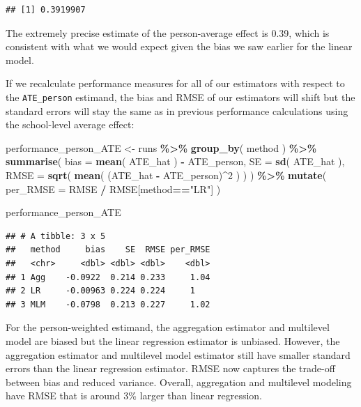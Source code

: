 \documentclass[
]{book}
\newenvironment{Shaded}{\begin{snugshade}}{\end{snugshade}}
\newcommand{\AttributeTok}[1]{\textcolor[rgb]{0.13,0.29,0.53}{#1}}
\newcommand{\DecValTok}[1]{\textcolor[rgb]{0.00,0.00,0.81}{#1}}
\newcommand{\FunctionTok}[1]{\textcolor[rgb]{0.13,0.29,0.53}{\textbf{#1}}}
\newcommand{\NormalTok}[1]{#1}
\newcommand{\OtherTok}[1]{\textcolor[rgb]{0.56,0.35,0.01}{#1}}
\newcommand{\SpecialCharTok}[1]{\textcolor[rgb]{0.81,0.36,0.00}{\textbf{#1}}}
\newcommand{\StringTok}[1]{\textcolor[rgb]{0.31,0.60,0.02}{#1}}
\begin{document}
\begin{verbatim}
## [1] 0.3919907
\end{verbatim}

The extremely precise estimate of the person-average effect is 0.39, which is consistent with what we would expect given the bias we saw earlier for the linear model.

If we recalculate performance measures for all of our estimators with respect to the \texttt{ATE\_person} estimand, the bias and RMSE of our estimators will shift but the standard errors will stay the same as in previous performance calculations using the school-level average effect:

\begin{Shaded}
\begin{Highlighting}[]
\NormalTok{performance\_person\_ATE }\OtherTok{\textless{}{-}}
\NormalTok{  runs }\SpecialCharTok{\%\textgreater{}\%} 
  \FunctionTok{group\_by}\NormalTok{( method ) }\SpecialCharTok{\%\textgreater{}\%}
  \FunctionTok{summarise}\NormalTok{( }
    \AttributeTok{bias =} \FunctionTok{mean}\NormalTok{( ATE\_hat ) }\SpecialCharTok{{-}}\NormalTok{ ATE\_person,}
    \AttributeTok{SE =} \FunctionTok{sd}\NormalTok{( ATE\_hat ),}
    \AttributeTok{RMSE =} \FunctionTok{sqrt}\NormalTok{( }\FunctionTok{mean}\NormalTok{( (ATE\_hat }\SpecialCharTok{{-}}\NormalTok{ ATE\_person)}\SpecialCharTok{\^{}}\DecValTok{2}\NormalTok{ ) )}
\NormalTok{  ) }\SpecialCharTok{\%\textgreater{}\%}
  \FunctionTok{mutate}\NormalTok{( }\AttributeTok{per\_RMSE =}\NormalTok{ RMSE }\SpecialCharTok{/}\NormalTok{ RMSE[method}\SpecialCharTok{==}\StringTok{"LR"}\NormalTok{] )}

\NormalTok{performance\_person\_ATE}
\end{Highlighting}
\end{Shaded}

\begin{verbatim}
## # A tibble: 3 x 5
##   method     bias    SE  RMSE per_RMSE
##   <chr>     <dbl> <dbl> <dbl>    <dbl>
## 1 Agg    -0.0922  0.214 0.233     1.04
## 2 LR     -0.00963 0.224 0.224     1   
## 3 MLM    -0.0798  0.213 0.227     1.02
\end{verbatim}

For the person-weighted estimand, the aggregation estimator and multilevel model are biased but the linear regression estimator is unbiased.
However, the aggregation estimator and multilevel model estimator still have smaller standard errors than the linear regression estimator.
RMSE now captures the trade-off between bias and reduced variance.
Overall, aggregation and multilevel modeling have RMSE that is around 3\% larger than linear regression.
\end{document}
